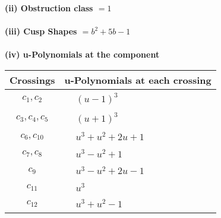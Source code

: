 \documentclass[1p]{elsarticle_modified}
\theoremstyle{definition}
\begin{document}
\flushleft \textbf{(ii) Obstruction class $= 1$}\\~\\
\flushleft \textbf{(iii) Cusp Shapes $= b^2+5 b-1$}\\~\\
\newpage\renewcommand{\arraystretch}{1}
\flushleft \textbf{(iv) u-Polynomials at the component}\newline \\
\begin{tabular}{m{50pt}|m{274pt}}
Crossings & \hspace{64pt}u-Polynomials at each crossing \\
\hline $$\begin{aligned}c_{1},c_{2}\end{aligned}$$&$\begin{aligned}
&(u-1)^3
\end{aligned}$\\
\hline $$\begin{aligned}c_{3},c_{4},c_{5}\end{aligned}$$&$\begin{aligned}
&(u+1)^3
\end{aligned}$\\
\hline $$\begin{aligned}c_{6},c_{10}\end{aligned}$$&$\begin{aligned}
&u^3+u^2+2 u+1
\end{aligned}$\\
\hline $$\begin{aligned}c_{7},c_{8}\end{aligned}$$&$\begin{aligned}
&u^3- u^2+1
\end{aligned}$\\
\hline $$\begin{aligned}c_{9}\end{aligned}$$&$\begin{aligned}
&u^3- u^2+2 u-1
\end{aligned}$\\
\hline $$\begin{aligned}c_{11}\end{aligned}$$&$\begin{aligned}
&u^3
\end{aligned}$\\
\hline $$\begin{aligned}c_{12}\end{aligned}$$&$\begin{aligned}
&u^3+u^2-1
\end{aligned}$\\
\hline
\end{tabular}\\~\\
\end{document}
